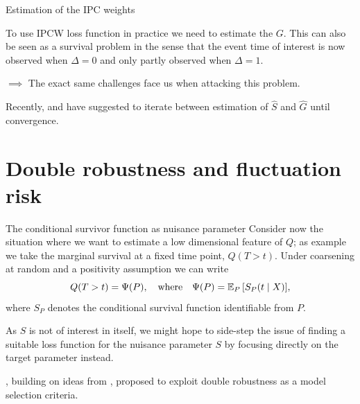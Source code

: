 \documentclass[smaller]{beamer}\usepackage{listings}
\begin{document}
\begin{frame}[label={sec:org7169e7c}]{Estimation of the IPC weights}
\small

To use IPCW loss function in practice we need to estimate the \(G\). This can also be seen as a
survival problem in the sense that the event time of interest is now observed when \(\Delta =0\) and
only partly observed when \(\Delta =1\).

\vfill

\(\implies\) The exact same challenges face us when attacking this problem.

\vfill

\def\shift{2.3}
\def\ls{}
\def\lw{.5mm}
\begin{center}
\end{center}

\vfill

Recently, \cite{han2021inverse} and \cite{westling2021inference} have suggested to iterate between
estimation of \(\hat S\) and \(\hat G\) until convergence.
\end{frame}


\section{Double robustness and fluctuation risk}
\label{sec:org2f87225}
\begin{frame}[label={sec:org9383a37}]{The conditional survivor function as nuisance parameter}
Consider now the situation where we want to estimate a low dimensional feature of \(Q\); as example
we take the marginal survival at a fixed time point, \(Q(T > t)\). Under coarsening at random and a
positivity assumption we can write
\begin{equation*}
  Q(T > t) = \Psi(P),
  \quad \text{where} \quad
  \Psi(P) = \operatorname{\mathbb{E}}_P{\left[ S_P(t \mid X) \right]},
\end{equation*}
where \(S_P\) denotes the conditional survival function identifiable from \(P\). 

\vfill

As \(S\) is not of interest in itself, we might hope to side-step the issue of finding a suitable
loss function for the nuisance parameter \(S\) by focusing directly on the target parameter instead.

\vfill

\cite{tchetgenYifanTagetDML}, building on ideas from \cite{robins2007comment}, proposed to exploit
double robustness as a model selection criteria.
\end{frame}
\end{document}
